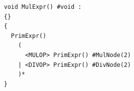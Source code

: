 \documentclass[dvipdfmx]{jarticle}
\begin{document}
\begin{minipage}{0.6\textwidth}
\begin{Verbatim}[frame=single]
void MulExpr() #void :
{}
{
  PrimExpr()
    (
      <MULOP> PrimExpr() #MulNode(2)
    | <DIVOP> PrimExpr() #DivNode(2)
    )*
}
\end{Verbatim}
\end{minipage}
\end{document}
